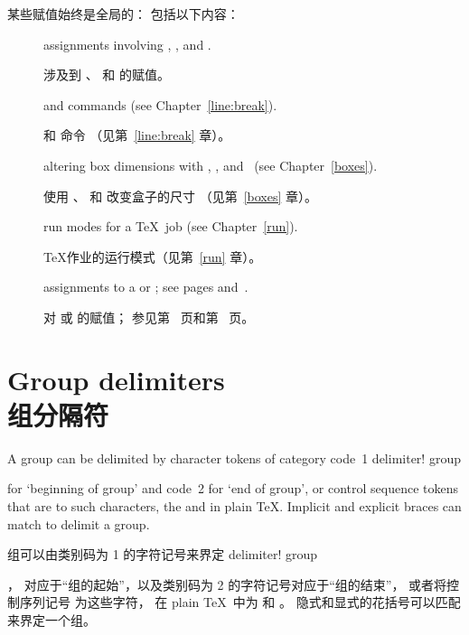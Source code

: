 某些赋值始终是全局的： 包括以下内容：
\begin{description}%
\item []
assignments involving , , 
and .

涉及到 、 和  的赋值。
\item []
 and  commands
(see Chapter~\ref{line:break}).

 和  命令
（见第~\ref{line:break} 章）。
\item []
altering box dimensions with , , and~
(see Chapter~\ref{boxes}).

使用 、 和  改变盒子的尺寸
（见第~\ref{boxes} 章）。
\item []
run modes for a \TeX\ job (see Chapter~\ref{run}).

\TeX 作业的运行模式（见第~\ref{run} 章）。
\item []
assignments to a  or ;
see %
pages \pageref{special:int:list} and~\pageref{special:dimen:list}.

对  或  的赋值；
参见第~\pageref{special:int:list} 页和第~\pageref{special:dimen:list} 页。 
\end{description}


\section{Group delimiters\\组分隔符}

A group can be delimited by character tokens of category code~1 
\term delimiter! group\par
for `beginning of group' and code~2 for `end of  group', or
control sequence tokens that are  to such characters,
the  and  in plain \TeX.
Implicit and explicit braces can match to delimit
a group.

组可以由类别码为 1 的字符记号来界定 \term delimiter! group\par，
对应于“组的起始”，以及类别码为 2 的字符记号对应于“组的结束”，
或者将控制序列记号  为这些字符，
在 plain \TeX\ 中为  和 。
隐式和显式的花括号可以匹配来界定一个组。

